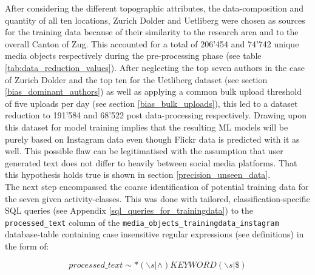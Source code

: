 After considering the different topographic attributes, the data-composition and quantity of all ten locations, Zurich Dolder and Uetliberg were chosen as sources for the training data because of their similarity to the research area and to the overall Canton of Zug. This accounted for a total of 206'454 and 74'742 unique media objects respectively during the pre-processing phase (see table \ref{tab:data_reduction_values}). After neglecting the top seven authors in the case of Zurich Dolder and the top ten for the Uetliberg dataset (see section \ref{bias_dominant_authors}) as well as applying a common bulk upload threshold of five uploads per day (see section \ref{bias_bulk_uploads}), this led to a dataset reduction to 191'584 and 68'522 post data-processing respectively. Drawing upon this dataset for model training implies that the resulting ML models will be purely based on Instagram data even though Flickr data is predicted with it as well. This possible flaw can be legitimatised with the assumption that user generated text does not differ to heavily between social media platforms. That this hypothesis holds true is shown in section \ref{precision_unseen_data}.\\

The next step encompassed the coarse identification of potential training data for the seven given activity-classes. This was done with tailored, classification-specific SQL queries (see Appendix \ref{sql_queries_for_trainingdata}) to the \texttt{processed\_text} column of the \texttt{media\_objects\_trainingdata\_instagram} database-table containing case insensitive regular expressions (see definitions) in the form of:

\[processed\_text \sim * (\backslash s | \wedge)KEYWORD(\backslash s | \$)\]

